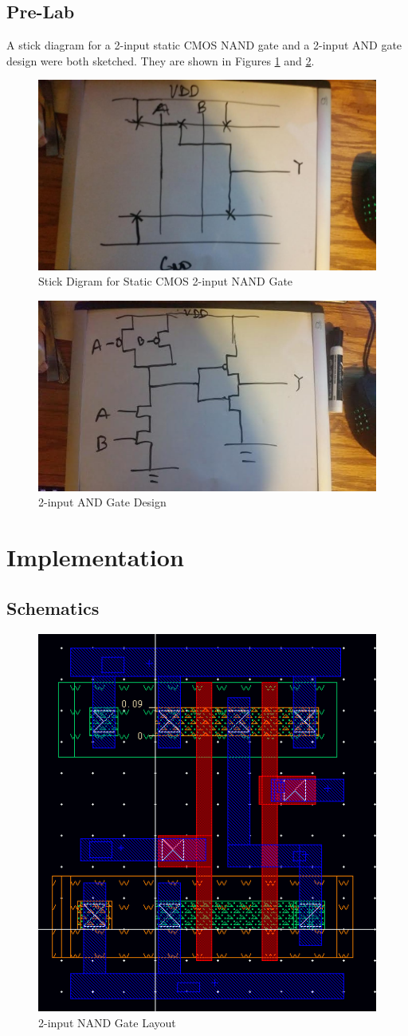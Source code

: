 \documentclass[12pt]{article}
\begin{document}
\subsection{Pre-Lab}
A stick diagram for a 2-input static CMOS NAND gate and a 2-input AND gate design were both sketched. They are shown in Figures \ref{fig:prelab-stick} and \ref{fig:prelab-design}.
\begin{figure}[H]
\centering
\includegraphics[width=0.5\linewidth]{prelab-stick}
\caption{Stick Digram for Static CMOS 2-input NAND Gate}
\label{fig:prelab-stick}
\end{figure}

\begin{figure}[H]
\centering
\includegraphics[width=0.5\linewidth]{prelab-design}
\caption{2-input AND Gate Design}
\label{fig:prelab-design}
\end{figure}

\section{Implementation}
\subsection{Schematics}
\begin{figure}[H]
	\centering
	\includegraphics[width=0.7\linewidth]{nand2-layout}
	\caption{2-input NAND Gate Layout}
	\label{fig:nand2-layout}
\end{figure}
\end{document}

